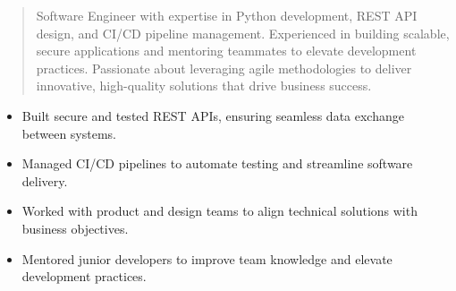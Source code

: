 



\makecvheader

\begin{quote}
  \noindent
  Software Engineer with expertise in Python development, REST API design, and CI/CD pipeline management. Experienced in building scalable, secure applications and mentoring teammates to elevate development practices. Passionate about leveraging agile methodologies to deliver innovative, high-quality solutions that drive business success.
\end{quote}

\par\smallskip
\noindent
\begin{minipage}{20cm}
  \begin{minipage}{9.75cm}
    \begin{itemize}
      \item Built secure and tested REST APIs, ensuring seamless data exchange between systems.
      \item Managed CI/CD pipelines to automate testing and streamline software delivery.
    \end{itemize}
  \end{minipage}
  \hfill
  \begin{minipage}{9.75cm}
    \begin{itemize}
      \item Worked with product and design teams to align technical solutions with business objectives.
      \item Mentored junior developers to improve team knowledge and elevate development practices.
    \end{itemize}
  \end{minipage}
\end{minipage}
\par\smallskip
\divider

